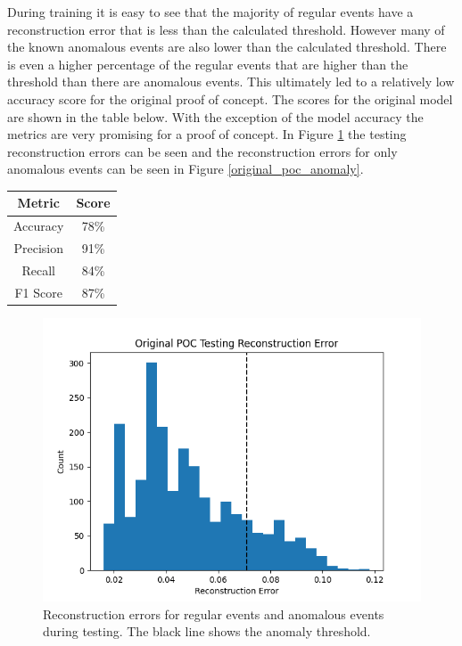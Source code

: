 \documentclass[a4paper,11pt]{article}
\begin{document}
During training it is easy to see that the majority of regular events have a reconstruction error that is less than the calculated threshold. However many of the known anomalous events are also lower than the calculated threshold. There is even a higher percentage of the regular events that are higher than the threshold than there are anomalous events. This ultimately led to a relatively low accuracy score for the original proof of concept. The scores for the original model are shown in the table below. With the exception of the model accuracy the metrics are very promising for a proof of concept. In Figure \ref{original_poc_test} the testing reconstruction errors can be seen and the reconstruction errors for only anomalous events can be seen in Figure \ref{original_poc_anomaly}.
\begin{center}
\begin{tabular}{ |c|c| } 
 \hline
 Metric & Score \\ \hline
 Accuracy & 78\% \\
 Precision & 91\% \\
 Recall & 84\% \\
 F1 Score & 87\% \\
 \hline
\end{tabular}
\end{center}
\begin{figure}[H]
\centering
\includegraphics[width=.8\textwidth]{original_poc_test_reconstruction.png}
\caption{Reconstruction errors for regular events and anomalous events during testing. The black line shows the anomaly threshold.}
\label{original_poc_test}
\end{figure}
\end{document}
